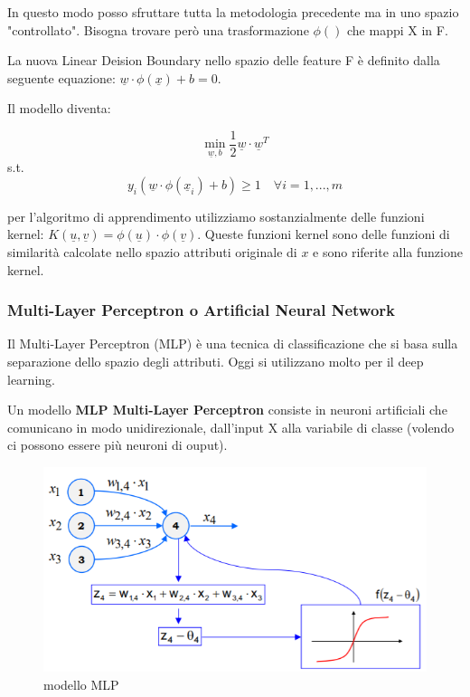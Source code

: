 In questo modo posso sfruttare tutta la metodologia precedente ma in uno spazio "controllato". Bisogna trovare però una trasformazione $\phi()$ che mappi X in F.

La nuova Linear Deision Boundary nello spazio delle feature F è definito dalla seguente equazione: $\underline{w} \cdot \phi(\underline{x}) + b = 0$. 

Il modello diventa:

\[ \min_{\underline{w},b} \frac{1}{2}\underline{w} \cdot \underline{w}^T \]
\qquad s.t.
\[ y_i (\underline{w} \cdot \phi(\underline{x}_i) + b) \ge 1 \quad \forall i = 1, ..., m\]

per l'algoritmo di apprendimento utilizziamo sostanzialmente delle funzioni kernel: $K(\underline{u}, \underline{v}) = \phi(\underline{u}) \cdot \phi(\underline{v})$. Queste funzioni kernel sono delle funzioni di similarit\`a calcolate nello spazio attributi originale di $x$ e sono riferite alla funzione kernel.

\subsubsection{Multi-Layer Perceptron o Artificial Neural Network}
Il Multi-Layer Perceptron (MLP) è una tecnica di classificazione che si basa sulla separazione dello spazio degli attributi. Oggi si utilizzano molto per il deep learning.
\begin{defn}
	Un modello \textbf{MLP Multi-Layer Perceptron} consiste in neuroni artificiali che comunicano in modo unidirezionale, dall'input X alla variabile di classe (volendo ci possono essere pi\`u neuroni di ouput).
\end{defn}

\begin{figure}[H]
	\hspace{-0.5cm}
	\includegraphics[height=0.45 \linewidth]{classification/pict/mlp.png}
	\caption{modello MLP}
\end{figure}

